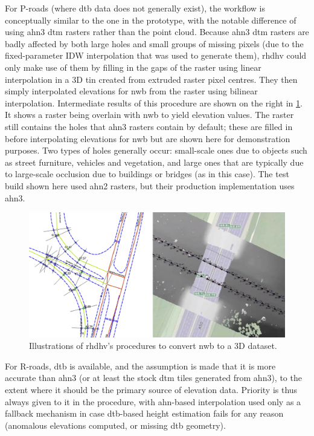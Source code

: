 For P-roads (where \ac{dtb} data does not generally exist), the workflow is conceptually similar to the one in the prototype, with the notable difference of using \ac{ahn3} \ac{dtm} rasters rather than the point cloud. Because \ac{ahn3} \ac{dtm} rasters are badly affected by both large holes and small groups of missing pixels (due to the fixed-parameter IDW interpolation that was used to generate them), \ac{rhdhv} could only make use of them by filling in the gaps of the raster using linear interpolation in a 3D \ac{tin} created from extruded raster pixel centres. They then simply interpolated elevations for \ac{nwb} from the raster using bilinear interpolation. Intermediate results of this procedure are shown on the right in \ref{fig:rhdhv}. It shows a raster being overlain with \ac{nwb} to yield elevation values. The raster still contains the holes that \ac{ahn3} rasters contain by default; these are filled in before interpolating elevations for \ac{nwb} but are shown here for demonstration purposes. Two types of holes generally occur: small-scale ones due to objects such as street furniture, vehicles and vegetation, and large ones that are typically due to large-scale occlusion due to buildings or bridges (as in this case). The test build shown here used \ac{ahn2} rasters, but their production implementation uses \ac{ahn3}.

\begin{figure}
    \centering
    \includegraphics[width=\linewidth]{final_report/figs/rhdhv_combined.png}
    \caption{Illustrations of \ac{rhdhv}'s procedures to convert \ac{nwb} to a 3D dataset.}
    \label{fig:rhdhv}
\end{figure}

For R-roads, \ac{dtb} is available, and the assumption is made that it is more accurate than \ac{ahn3} (or at least the stock \ac{dtm} tiles generated from \ac{ahn3}), to the extent where it should be the primary source of elevation data. Priority is thus always given to it in the procedure, with \ac{ahn}-based interpolation used only as a fallback mechanism in case \ac{dtb}-based height estimation fails for any reason (anomalous elevations computed, or missing \ac{dtb} geometry).


